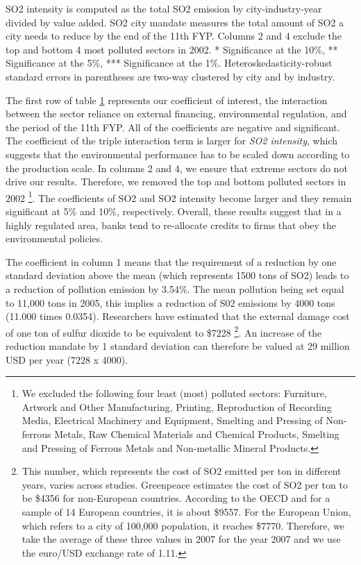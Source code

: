 \documentclass[12pt]{article}
\begin{document}
\begin{table}[hbt!]
{\begin{threeparttable}
\begin{tabular}{l*{4}{c}}
\bottomrule
  \end{tabular}
  \begin{tablenotes}
      \small
      \item SO2 intensity is computed as the total SO2 emission by city-industry-year divided by value added. SO2 city mandate measures the total amount of SO2 a city needs to reduce by the end of the 11th FYP. Columns 2 and 4 exclude the top and bottom 4 most polluted sectors in 2002.
 * Significance at the 10\%, ** Significance at the 5\%, *** Significance at the 1\%. Heteroskedasticity-robust standard errors in parentheses are two-way clustered by city and by industry.
    \end{tablenotes}
    \label{tab:table2}
\end{threeparttable}
}
\end{table}

The first row of table \ref{tab:table2} represents our coefficient of interest, the interaction between the sector reliance on external financing, environmental regulation, and the period of the 11th FYP. All of the coefficients are negative and significant. The coefficient of the triple interaction term is larger for \textit{SO2 intensity}, which suggests that the environmental performance has to be scaled down according to the production scale. In columns 2 and 4, we ensure that extreme sectors do not drive our results. Therefore, we removed the top and bottom polluted sectors in 2002 \footnote{We excluded the following four least (most) polluted sectors: Furniture, Artwork and Other Manufacturing, Printing, Reproduction of Recording Media, Electrical Machinery and Equipment, Smelting and Pressing of Non-ferrous Metals, Raw Chemical Materials and Chemical Products, Smelting and Pressing of Ferrous Metals and  Non-metallic Mineral Products.}. The coefficients of SO2 and SO2 intensity become larger and they remain significant at 5\% and 10\%, respectively. Overall, these results suggest that in a highly regulated area, banks tend to re-allocate credits to firms that obey the environmental policies.

The coefficient in column 1 means that the requirement of a  reduction by one standard deviation above the mean (which represents 1500 tons of SO2) leads to a reduction of pollution emission by 3.54\%. The mean pollution being set equal to 11,000 tons in 2005, this implies a reduction of S02 emissions by 4000 tons (11.000 times 0.0354). Researchers have estimated that the external damage cost of one ton of sulfur dioxide to be equivalent to \$7228 \footnote{This number, which represents the cost of SO2 emitted per ton in different years, varies across studies. Greenpeace estimates the cost of SO2 per ton to be \$4356 for non-European countries. According to the OECD and for a sample of  14 European countries, it is about \$9557. For the European Union, which refers to a city of 100,000 population, it reaches \$7770. Therefore, we take the average of these three values in 2007 for the year  2007 and we use the euro/USD exchange rate of 1.11.}. An increase of the reduction mandate by 1 standard deviation can therefore be valued at 29 million USD per year (7228 x 4000).  
\end{document}
